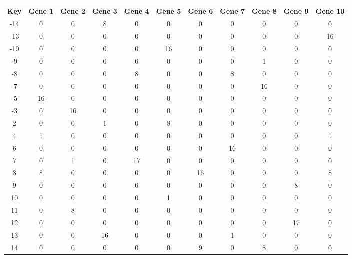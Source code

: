 \begin{tabular}{|c|c|c|c|c|c|c|c|c|c|c|}
\hline
Key & Gene 1 & Gene 2 & Gene 3 & Gene 4 & Gene 5 & Gene 6 & Gene 7 & Gene 8 & Gene 9 & Gene 10 \\
\hline
-14 & 0 & 0 & 8 & 0 & 0 & 0 & 0 & 0 & 0 & 0 \\
-13 & 0 & 0 & 0 & 0 & 0 & 0 & 0 & 0 & 0 & 16 \\
-10 & 0 & 0 & 0 & 0 & 16 & 0 & 0 & 0 & 0 & 0 \\
-9 & 0 & 0 & 0 & 0 & 0 & 0 & 0 & 1 & 0 & 0 \\
-8 & 0 & 0 & 0 & 8 & 0 & 0 & 8 & 0 & 0 & 0 \\
-7 & 0 & 0 & 0 & 0 & 0 & 0 & 0 & 16 & 0 & 0 \\
-5 & 16 & 0 & 0 & 0 & 0 & 0 & 0 & 0 & 0 & 0 \\
-3 & 0 & 16 & 0 & 0 & 0 & 0 & 0 & 0 & 0 & 0 \\
2 & 0 & 0 & 1 & 0 & 8 & 0 & 0 & 0 & 0 & 0 \\
4 & 1 & 0 & 0 & 0 & 0 & 0 & 0 & 0 & 0 & 1 \\
6 & 0 & 0 & 0 & 0 & 0 & 0 & 16 & 0 & 0 & 0 \\
7 & 0 & 1 & 0 & 17 & 0 & 0 & 0 & 0 & 0 & 0 \\
8 & 8 & 0 & 0 & 0 & 0 & 16 & 0 & 0 & 0 & 8 \\
9 & 0 & 0 & 0 & 0 & 0 & 0 & 0 & 0 & 8 & 0 \\
10 & 0 & 0 & 0 & 0 & 1 & 0 & 0 & 0 & 0 & 0 \\
11 & 0 & 8 & 0 & 0 & 0 & 0 & 0 & 0 & 0 & 0 \\
12 & 0 & 0 & 0 & 0 & 0 & 0 & 0 & 0 & 17 & 0 \\
13 & 0 & 0 & 16 & 0 & 0 & 0 & 1 & 0 & 0 & 0 \\
14 & 0 & 0 & 0 & 0 & 0 & 9 & 0 & 8 & 0 & 0 \\
\hline
\end{tabular}